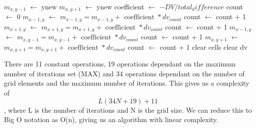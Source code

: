 \documentclass[aps,twocolumn,pre,nofootinbib,10pt]{revtex4-1}
\newcommand*\Let[2]{\State #1 $\gets$ #2}
\begin{document}
\begin{algorithm}
\begin{algorithmic}
                                \Let{$m_{x,y-1}$}{ynew}
                            \EndIf
                                \Let{$m_{x,y+1}$}{ynew}
                            \EndIf
                        \EndIf
                    \EndIf
                    \Else
                        \Let{coefficient}{$-DV/total_difference$}
                        \Let{count}{0}
                                \Let{$m_{x-1,y}$}{$m_{x-1,y} = m_{x-1,y} + \textrm{ coefficient } * dv_{count}$}
                                \Let{count}{count + 1}
                            \EndIf
                        \EndIf
                                \Let{$m_{x+1,y}$}{$m_{x+1,y} = m_{x+1,y} + \textrm{ coefficient } * dv_{count}$}
                                \Let{count}{count + 1}
                            \EndIf
                        \EndIf
                                \Let{$m_{x-1,y}$}{$m_{x,y-1} = m_{x,y-1} + \textrm{ coefficient } * dv_{count}$}
                                \Let{count}{count + 1}
                            \EndIf
                        \EndIf
                                \Let{$m_{x,y+1}$}{$m_{x,y+1} = m_{x,y+1} + \textrm{ coefficient } * dv_{count}$}
                                \Let{count}{count + 1}
                            \EndIf
                        \EndIf
                    \State clear cells
                    \State clear dv
                \EndIf
            \EndFor
        \EndFor
        \EndFunction
    \end{algorithmic}
\end{algorithm}

There are 11 constant operations, 19 operations dependant on the maximum number of iterations set (MAX) and 34 operations dependant on the number of grid elements and the maximum number of iterations. This gives us a complexity of \[L(34N+19)+11\], where L is the number of iterations and N is the grid size. We can reduce this to Big O notation as O(n), giving us an algorithm with linear complexity.
\end{document}
